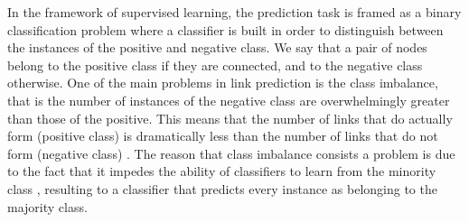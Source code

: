 \documentclass{acm_proc_article-sp}
\begin{document}




In the framework of supervised learning, the prediction task is framed as a binary classification problem where a classifier is built in order to distinguish between the instances of the positive and negative class. We say that a pair of nodes belong to the positive class if they are connected, and to the negative class otherwise. One of the main problems in link prediction is the class imbalance, that is the number of instances of the negative class are overwhelmingly greater than those of the positive. This means that the number of links that do actually form (positive class) is dramatically less than the number of links that do not form (negative class) \cite{Lichtenwalter:2010:NPM:1835804.1835837}. The reason that class imbalance consists a problem is due to the fact that it impedes the ability of classifiers to learn from the minority class \cite{Cieslak2012}, resulting to a classifier that predicts every instance as belonging to the majority class. 
 
\end{document}

